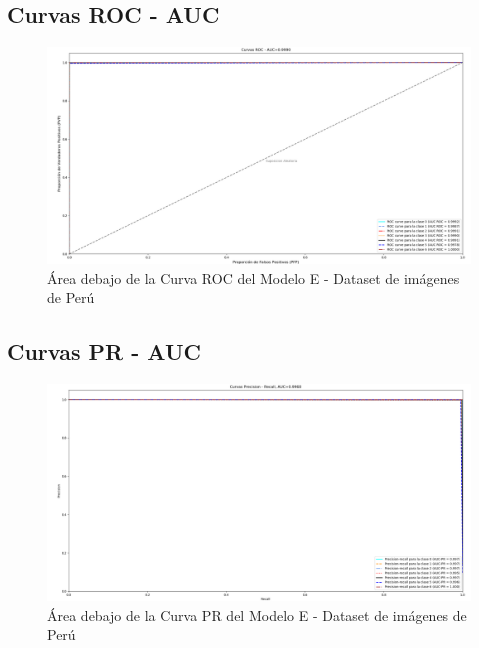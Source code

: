 		\subsection{Curvas ROC - AUC}  
					\begin{figure}[H]
						\includegraphics[width=1\textwidth, height=\textheight,keepaspectratio]{images/desarrollo/testResults/peru/ROC_curve_modelE} 
						\begin{center}
						\caption{\small{Área debajo de la Curva ROC del Modelo E - Dataset de imágenes de Perú}}
						
						{\small{\fontsize{10}{16.8}\selectfont {Fuente propia}}}
						\end{center}
						\vspace{-1.5em}
					\end{figure}
		\subsection{Curvas PR - AUC}  
					\begin{figure}[H]
						\includegraphics[width=1\textwidth, height=\textheight,keepaspectratio]{images/desarrollo/testResults/peru/PR_curve_modelE} 
						\begin{center}
						\caption{\small{Área debajo de la Curva PR del Modelo E - Dataset de imágenes de Perú}}
						{\small{\fontsize{10}{16.8}\selectfont {Fuente propia}}}
						\end{center}
						\vspace{-1.5em}
					\end{figure}

